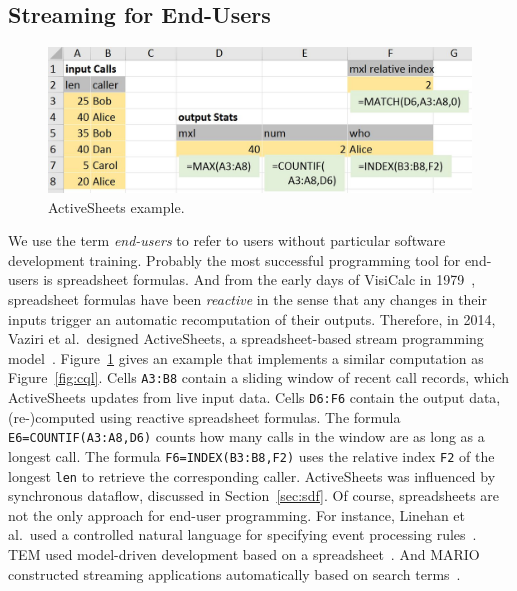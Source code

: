 \subsection{Streaming for End-Users}\label{sec:eup} %

\begin{figure}[!h]
\centerline{\includegraphics[width=\columnwidth]{CallStats.jpg}}
\vspace*{-4mm}
\caption{\label{fig:activesheets}ActiveSheets example.}
\end{figure}

We use the term \emph{end-users} to refer to users without particular
software development training. Probably the most successful
programming tool for end-users is spreadsheet formulas. And from the
early days of VisiCalc in 1979~\cite{bricklin_frankston_1979},
spreadsheet formulas have been \emph{reactive} in the sense that any
changes in their inputs trigger an automatic recomputation of their
outputs. Therefore, in 2014, Vaziri et al.\ designed \textsf{ActiveSheets}, a
spreadsheet-based stream programming model~\cite{vaziri_et_al_2014}.
Figure~\ref{fig:activesheets} gives an example that implements a
similar computation as Figure~\ref{fig:cql}.
Cells \lstinline{A3:B8} contain a sliding window of recent call
records, which ActiveSheets updates from live input data. Cells
\lstinline{D6:F6} contain the output data, \mbox{(re-)}com\-pu\-ted
using reactive spreadsheet formulas. The formula
\mbox{\lstinline{E6=COUNTIF(A3:A8,D6)}} counts how many calls in the
window are as long as a longest call. The formula
\mbox{\lstinline{F6=INDEX(B3:B8,F2)}} uses the relative index \lstinline{F2}
of the longest \lstinline{len} to retrieve the corresponding
caller.  ActiveSheets was influenced by
synchronous dataflow, discussed in Section~\ref{sec:sdf}.
%
Of course, spreadsheets are not the
only approach for end-user programming. For instance, Linehan et al.\ used a
controlled natural language for specifying event processing
rules~\cite{linehan_et_al_2011}. \textsf{TEM} used model-driven development
based on a spreadsheet~\cite{etzion_et_al_2016}. And \textsf{MARIO}
constructed streaming applications automatically based on
search terms~\cite{riabov_et_al_2008}.
